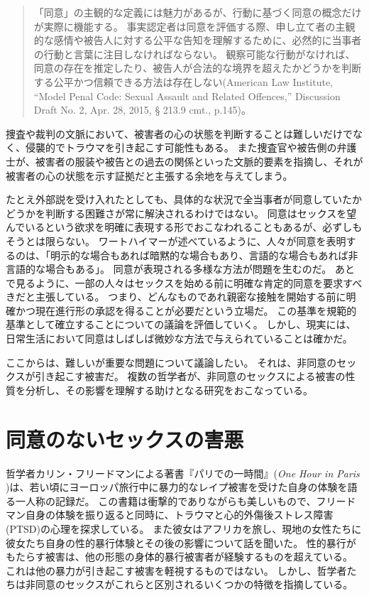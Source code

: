 \documentclass[paper=a4,book,openany]{jlreq}
\newcommand{\ig}[1]{}           %
\begin{document}
\begin{quote}
「同意」の主観的な定義には魅力があるが、行動に基づく同意の概念だけが実際に機能する。
事実認定者は同意を評価する際、申し立て者の主観的な感情や被告人に対する公平な告知を理解するために、必然的に当事者の行動と言葉に注目しなければならない。
観察可能な行動がなければ、同意の存在を推定したり、被告人が合法的な境界を超えたかどうかを判断する公平かつ信頼できる方法は存在しない(American Law  Institute, ``Model Penal Code: Sexual Assault and Related Offences,'' Discussion Draft No. 2, Apr. 28, 2015, § 213.9 cmt., p.145)。
\end{quote}

捜査や裁判の文脈において、被害者の心の状態を判断することは難しいだけでなく、侵襲的でトラウマを引き起こす可能性もある。
また捜査官や被告側の弁護士が、被害者の服装や被告との過去の関係といった文脈的要素を指摘し、それが被害者の心の状態を示す証拠だと主張する余地を与えてしまう。

たとえ外部説を受け入れたとしても、具体的な状況で全当事者が同意していたかどうかを判断する困難さが常に解決されるわけではない。
同意はセックスを望んでいるという欲求を明確に表現する形でおこなわれることもあるが、必ずしもそうとは限らない。
ワートハイマーが述べているように、人々が同意を表明するのは、「明示的な場合もあれば暗黙的な場合もあり、言語的な場合もあれば非言語的な場合もある」\citep[p.346]{wertheimer03:_consen_sexual_relat}。
同意が表現される多様な方法が問題を生むのだ。
あとで見るように、一部の人々はセックスを始める前に明確な肯定的同意を要求すべきだと主張している。
つまり、どんなものであれ親密な接触を開始する前に明確かつ現在進行形の承認を得ることが必要だという立場だ。
この基準を規範的基準として確立することについての議論を評価していく。
しかし、現実には、日常生活において同意はしばしば微妙な方法で与えられていることは確かだ。

ここからは、難しいが重要な問題について議論したい。
それは、非同意のセックスが引き起こす被害だ。
複数の哲学者が、非同意のセックスによる被害の性質を分析し、その影響を理解する助けとなる研究をおこなっている。

\section{同意のないセックスの害悪}

哲学者カリン・フリードマン\ig{Karyn L. Freedman}による著書『パリでの一時間』(\emph{One Hour in Paris} \citep{freedman14:_one_hour_paris})は、若い頃にヨーロッパ旅行中に暴力的なレイプ被害を受けた自身の体験を語る一人称の記録だ。
この書籍は衝撃的でありながらも美しいもので、フリードマン自身の体験を振り返ると同時に、トラウマと心的外傷後ストレス障害(PTSD)の心理を探求している。
また彼女はアフリカを旅し、現地の女性たちに彼女たち自身の性的暴行体験とその後の影響について話を聞いた。
性的暴行がもたらす被害は、他の形態の身体的暴行被害者が経験するものを超えている。
これは他の暴力が引き起こす被害を軽視するものではない。
しかし、哲学者たちは非同意のセックスがこれらと区別されるいくつかの特徴を指摘している。
\end{document}
